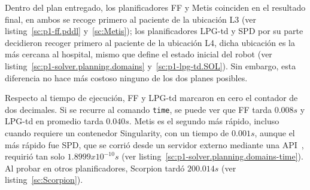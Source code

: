 \documentclass[a4paper,12pt,twocolumn]{article}
\begin{document}
Dentro del plan entregado, los planificadores FF y Metis coinciden en el resultado final, en ambos se recoge primero al paciente de la ubicación L3 (ver listing~\ref{sc:p1-ff.pddl} y~\ref{sc:Metis}); los planificadores LPG-td y SPD por su parte decidieron recoger primero al paciente de la ubicación L4, dicha ubicación es la más cercana al hospital, mismo que define el estado inicial del robot (ver listing~\ref{sc:p1-solver.planning.domains} y~\ref{sc:p1-lpg-td.SOL}). Sin embargo, esta diferencia no hace más costoso ninguno de los dos planes posibles.

Respecto al tiempo de ejecución, FF y LPG-td marcaron en cero el contador de dos decimales. Si se recurre al comando \texttt{time}, se puede ver que FF tarda $0.008 s$ y LPG-td en promedio tarda $0.040 s$. Metis es el segundo más rápido, incluso cuando requiere un contenedor Singularity, con un tiempo de $0.001 s$, aunque el más rápido fue SPD, que se corrió desde un servidor externo mediante una API~\citep{Muise2015}, requirió tan solo $1.8999 x 10^{-10} s$ (ver listing~\ref{sc:p1-solver.planning.domains-time}). Al probar en otros planificadores, Scorpion tardó $200.014 s$ (ver listing~\ref{sc:Scorpion}).
\end{document}
